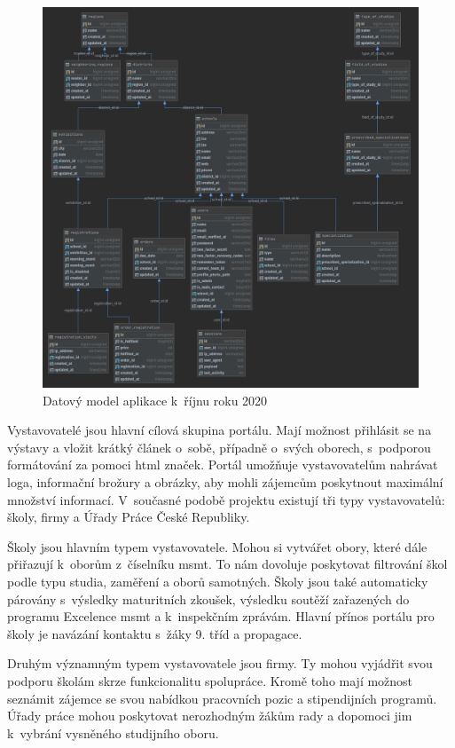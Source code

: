 \begin{figure}[H]
\centering
\includegraphics[width=\textwidth]{img/datovy-model-rijen-2020-2.png}
\caption{Datový model aplikace \bso{} k~říjnu roku 2020}
\label{fig:data-model-2020}
\end{figure}


Vystavovatelé jsou hlavní cílová skupina portálu. Mají možnost přihlásit se na výstavy a vložit krátký článek o~sobě,
případně o~svých oborech, s~podporou formátování za pomoci \acrshort{html} značek.
Portál umožňuje vystavovatelům nahrávat loga, informační brožury a obrázky, aby mohli zájemcům poskytnout maximální množství informací.
V~současné podobě projektu \bso{} existují tři typy vystavovatelů: školy, firmy a Úřady Práce České Republiky. 

Školy jsou hlavním typem vystavovatele. Mohou si vytvářet obory, které dále přiřazují k~oborům z~číselníku \acrshort{msmt}. To nám dovoluje poskytovat filtrování škol podle typu studia, zaměření a oborů samotných. Školy jsou také automaticky párovány s~výsledky maturitních zkoušek, výsledku soutěží zařazených do programu Excelence \acrshort{msmt} a k~inspekčním zprávám. Hlavní přínos portálu \bso{} pro školy je navázání kontaktu s~žáky 9. tříd a propagace. 

Druhým významným typem vystavovatele jsou firmy. Ty mohou vyjádřit svou podporu školám skrze funkcionalitu spolupráce. Kromě toho mají možnost seznámit zájemce se svou nabídkou pracovních pozic a stipendijních programů. Úřady práce mohou poskytovat nerozhodným žákům rady a dopomoci jim k~vybrání vysněného studijního oboru.
